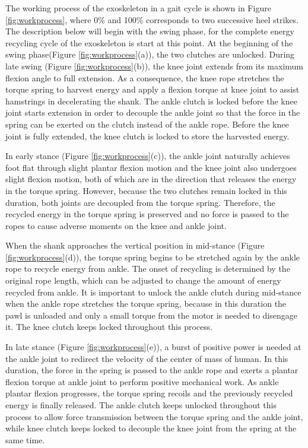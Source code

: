 \documentclass[twocolumn,cleanfoot,10pt]{asme2ej}
\begin{document}
The working process of the exoskeleton in a gait cycle is shown in Figure \ref{fig:workprocess}, where 0\% and 100\% corresponds to two successive heel strikes. The description below will begin with the swing phase, for the complete energy recycling cycle of the exoskeleton is start at this point. At the beginning of the swing phase(Figure \ref{fig:workprocess}(a)), the two clutches are unlocked. During late swing (Figure \ref{fig:workprocess}(b)), the knee joint extends from its maximum flexion angle to full extension. As a consequence, the knee rope stretches the torque spring to harvest energy and apply a flexion torque at knee joint to assist hamstrings in decelerating the shank. The ankle clutch is locked before the knee joint starts extension in order to decouple the ankle joint so that the force in the spring can be exerted on the clutch instead of the ankle rope. Before the knee joint is fully extended, the knee clutch is locked to store the harvested energy.

In early stance (Figure \ref{fig:workprocess}(c)), the ankle joint naturally achieves foot flat through slight plantar flexion motion and the knee joint also undergoes slight flexion motion, both of which are in the direction that releases the energy in the torque spring. However, because the two clutches remain locked in this duration, both joints are decoupled from the torque spring. Therefore, the recycled energy in the torque spring is preserved and no force is passed to the ropes to cause adverse moments on the knee and ankle joint.

When the shank approaches the vertical position in mid-stance (Figure \ref{fig:workprocess}(d)), the torque spring begins to be stretched again by the ankle rope to recycle energy from ankle. The onset of recycling is determined by the original rope length, which can be adjusted to change the amount of energy recycled from ankle. It is important to unlock the ankle clutch during mid-stance when the ankle rope stretches the torque spring, because in this duration the pawl is unloaded and only a small torque from the motor is needed to disengage it. The knee clutch keeps locked throughout this process.

In late stance (Figure \ref{fig:workprocess}(e)), a burst of positive power is needed at the ankle joint to redirect the velocity of the center of mass of human. In this duration, the force in the spring is passed to the ankle rope and exerts a plantar flexion torque at ankle joint to perform positive mechanical work. As ankle plantar flexion progresses, the torque spring recoils and the previously recycled energy is finally released. The ankle clutch keeps unlocked throughout this process to allow force transmission between the torque spring and the ankle joint, while knee clutch keeps locked to decouple the knee joint from the spring at the same time.
\end{document}
